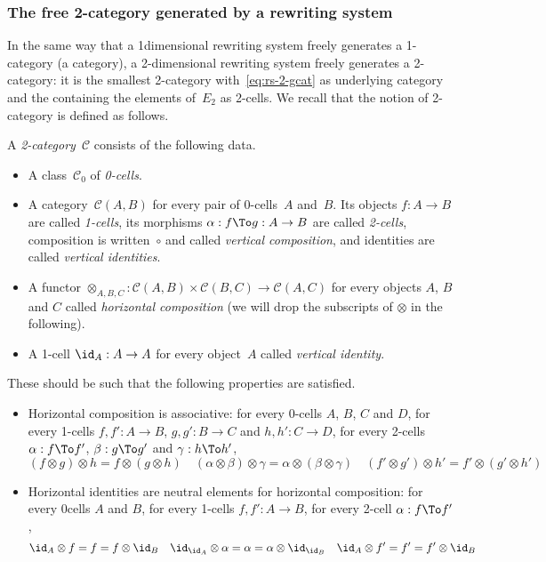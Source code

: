 \documentclass{LMCS}
\renewcommand{\C}{\mathcal{C}}
\begin{document}
\subsubsection{The free 2-category generated by a rewriting system}
\label{sec:rs-free-2-cat}
In the same way that a 1\nbd{}dimensional rewriting system freely generates a
1-category (\ie a category), a 2-dimensional rewriting system freely generates a
2-category: it is the smallest 2-category with~\eqref{eq:rs-2-gcat} as
underlying category and the containing the elements of~$E_2$ as 2-cells. We
recall that the notion of 2-category is defined as follows.

\begin{defi}
  \label{def:2-cat}
  A \emph{2-category}~$\C$ consists of the following data.
  \begin{itemize}
  \item A class~$\C_0$ of \emph{0-cells}.
  \item A category~$\C(A,B)$ for every pair of 0-cells~$A$ and~$B$. Its objects
    $f:A\to B$ are called \emph{1-cells}, its morphisms $\alpha:f\To g:A\to B$
    are called \emph{2-cells}, composition is written~$\circ$ and called
    \emph{vertical composition}, and identities are called \emph{vertical
      identities}.
  \item A functor $\otimes_{A,B,C}:\C(A,B)\times\C(B,C)\to\C(A,C)$ for every
    objects $A$, $B$ and $C$ called \emph{horizontal composition} (we will drop
    the subscripts of $\otimes$ in the following).
  \item A 1-cell $\id_A:A\to A$ for every object~$A$ called \emph{vertical
      identity}.
  \end{itemize}
  These should be such that the following properties are satisfied.
  \begin{itemize}
  \item Horizontal composition is associative: for every 0-cells $A$, $B$, $C$
    and $D$, for every 1-cells $f,f':A\to B$, $g,g':B\to C$ and $h,h':C\to D$,
    for every 2-cells $\alpha:f\To f'$, $\beta:g\To g'$ and $\gamma:h\To h'$,
    \[
    (f\otimes g)\otimes h=f\otimes(g\otimes h)
    \quad
    (\alpha\otimes\beta)\otimes\gamma=\alpha\otimes(\beta\otimes\gamma)
    \quad
    (f'\otimes g')\otimes h'=f'\otimes(g'\otimes h')
    \]
  \item Horizontal identities are neutral elements for horizontal composition:
    for every 0\nbd{}cells $A$ and $B$, for every 1-cells $f,f':A\to B$, for
    every 2-cell $\alpha:f\To f'$,
    \[
    \id_A\otimes f=f=f\otimes\id_B
    \quad
    \id_{\id_A}\otimes\alpha=\alpha=\alpha\otimes\id_{\id_B}
    \quad
    \id_A\otimes f'=f'=f'\otimes\id_B
    \]
  \end{itemize}
\end{defi}
\end{document}

